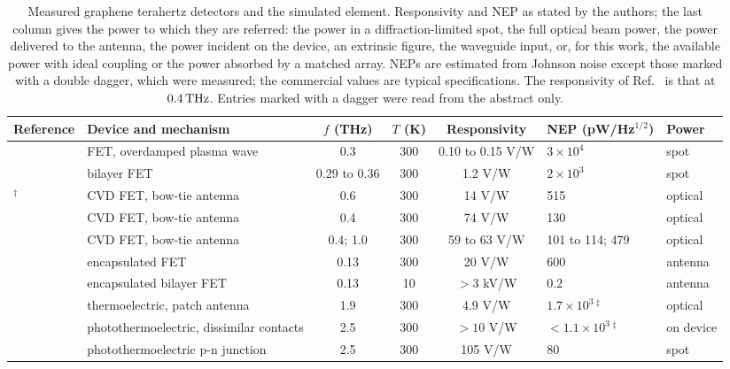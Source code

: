 \begin{table}
\caption{Measured graphene terahertz detectors and the simulated element.
Responsivity and NEP as stated by the authors; the last column gives the
power to which they are referred: the power in a diffraction-limited spot,
the full optical beam power, the power delivered to the antenna, the
power incident on the device, an
extrinsic figure, the waveguide input, or, for this work, the available
power with ideal coupling or the power absorbed by a matched array. NEPs are estimated from Johnson noise except those marked with
a double dagger, which were measured; the commercial values are typical
specifications. The responsivity of Ref.~\cite{ludwig2024terahertz} is that at $0.4\THz$. Entries marked with a dagger were read from the abstract
only.}
\label{tab:detectors}
\begin{ruledtabular}
\begin{tabular}{lL{0.21\textwidth}cccL{0.14\textwidth}l}
Reference & Device and mechanism & $f$ (THz) & $T$ (K) & Responsivity & NEP (pW/Hz$^{1/2}$) & Power \\
\hline
\cite{vicarelli2012graphene} & FET, overdamped plasma wave & 0.3 & 300 & 0.10 to 0.15 V/W & $3\times10^{4}$ & spot \\
\cite{spirito2014high} & bilayer FET & 0.29 to 0.36 & 300 & 1.2 V/W & $2\times10^{3}$ & spot \\
\cite{zak2014antenna}$^{\dagger}$ & CVD FET, bow-tie antenna & 0.6 & 300 & 14 V/W & 515 & optical \\
\cite{generalov2017graphene} & CVD FET, bow-tie antenna & 0.4 & 300 & 74 V/W & 130 & optical \\
\cite{ludwig2024terahertz} & CVD FET, bow-tie antenna & 0.4; 1.0 & 300 & 59 to 63 V/W & 101 to 114; 479 & optical \\
\cite{bandurin2018dual} & encapsulated FET & 0.13 & 300 & 20 V/W & 600 & antenna \\
\cite{bandurin2018resonant} & encapsulated bilayer FET & 0.13 & 10 & $>3$ kV/W & 0.2 & antenna \\
\cite{tong2015antenna} & thermoelectric, patch antenna & 1.9 & 300 & 4.9 V/W & $1.7\times10^{3}$\,$^{\ddagger}$ & optical \\
\cite{cai2014sensitive} & photothermoelectric, dissimilar contacts & 2.5 & 300 & $>10$ V/W & $<1.1\times10^{3}$\,$^{\ddagger}$ & on device \\
\cite{castilla2019fast} & photothermoelectric p-n junction & 2.5 & 300 & 105 V/W & 80 & spot \\

\end{tabular}
\end{ruledtabular}
\end{table}
